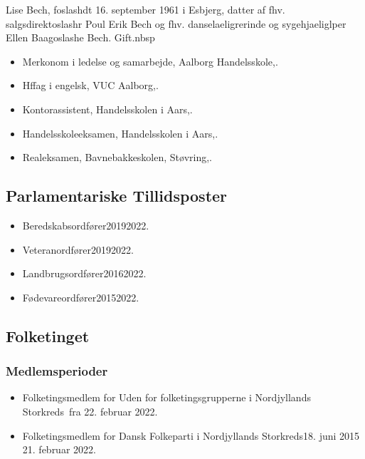 \documentclass[11pt, a4paper]{awesome-cv}
\begin{document}
\makecvheader[R]
\makelettertitle
\begin{cvletter}
Lise Bech, foslashdt 16. september 1961 i Esbjerg, datter af fhv. salgsdirektoslashr Poul Erik Bech og fhv. danselaeligrerinde og sygehjaeliglper Ellen Baagoslashe Bech. Gift.nbsp

\begin{itemize}
\item Merkonom i ledelse og samarbejde, Aalborg Handelsskole,.
\item Hffag i engelsk, VUC Aalborg,.
\item Kontorassistent, Handelsskolen i Aars,.
\item Handelsskoleeksamen, Handelsskolen i Aars,.
\item Realeksamen, Bavnebakkeskolen, Støvring,.
\end{itemize}
\subsection*{Parlamentariske Tillidsposter}
\begin{itemize}
\item Beredskabsordfører20192022.
\item Veteranordfører20192022.
\item Landbrugsordfører20162022.
\item Fødevareordfører20152022.
\end{itemize}
\subsection*{Folketinget}
\subsubsection*{Medlemsperioder}
\begin{itemize}
\item Folketingsmedlem for Uden for folketingsgrupperne i Nordjyllands Storkreds fra 22. februar 2022.
\item Folketingsmedlem for Dansk Folkeparti i Nordjyllands Storkreds18. juni 2015  21. februar 2022.
\end{itemize}

\end{cvletter}
\end{document}
